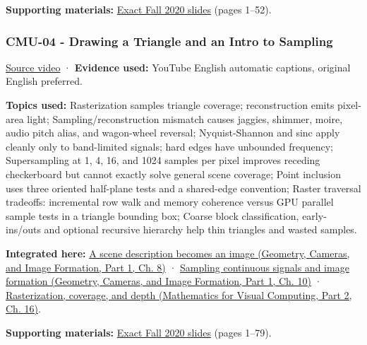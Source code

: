 \textbf{Supporting materials:} \href{https://15462.courses.cs.cmu.edu/fall2020content/lectures/03_vectorcalc/03_vectorcalc_slides.pdf}{Exact Fall 2020 slides} (pages 1--52).

\subsubsection{CMU-04 - Drawing a Triangle and an Intro to Sampling}\label{04-visual-computing-ii-ch036-cmu-04---drawing-a-triangle-and-an-intro-to-sampling}

\hypertarget{04-visual-computing-ii-ch036-cmu-04---drawing-a-triangle-and-an-intro-to-sampling}{}

\href{https://www.youtube.com/watch?v=B0hsT2npIc0}{Source video} · \textbf{Evidence used:} YouTube English automatic captions, original English preferred.

\textbf{Topics used:} Rasterization samples triangle coverage; reconstruction emits pixel-area light; Sampling/reconstruction mismatch causes jaggies, shimmer, moire, audio pitch alias, and wagon-wheel reversal; Nyquist-Shannon and sinc apply cleanly only to band-limited signals; hard edges have unbounded frequency; Supersampling at 1, 4, 16, and 1024 samples per pixel improves receding checkerboard but cannot exactly solve general scene coverage; Point inclusion uses three oriented half-plane tests and a shared-edge convention; Raster traversal tradeoffs: incremental row walk and memory coherence versus GPU parallel sample tests in a triangle bounding box; Coarse block classification, early-ins/outs and optional recursive hierarchy help thin triangles and wasted samples.

\textbf{Integrated here:} \href{../03-Geometry-Cameras-and-Image-Formation-P01/main.pdf\#nameddest=03-visual-computing-i-ch001-a-scene-description-becomes-an-image}{A scene description becomes an image (Geometry, Cameras, and Image Formation, Part 1, Ch. 8)} · \href{../03-Geometry-Cameras-and-Image-Formation-P01/main.pdf\#nameddest=03-visual-computing-i-ch003-sampling-continuous-signals-and-image-formation}{Sampling continuous signals and image formation (Geometry, Cameras, and Image Formation, Part 1, Ch. 10)} · \href{../02-Mathematics-for-Visual-Computing-P02/main.pdf\#nameddest=03-visual-computing-i-ch012-rasterization-coverage-and-depth}{Rasterization, coverage, and depth (Mathematics for Visual Computing, Part 2, Ch. 16)}.

\textbf{Supporting materials:} \href{https://15462.courses.cs.cmu.edu/fall2020content/lectures/04_drawingatriangle/04_drawingatriangle_slides.pdf}{Exact Fall 2020 slides} (pages 1--79).

